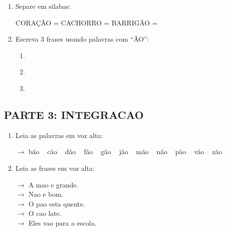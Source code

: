 \begin{exercicio}
\begin{enumerate}[resume]
  \item Separe em silabas:
  \begin{center}
  CORAÇÃO = \underline{\hspace{1cm}} \underline{\hspace{1cm}} \underline{\hspace{1cm}} \quad CACHORRO = \underline{\hspace{1cm}} \underline{\hspace{1cm}} \underline{\hspace{1cm}} \quad BARRIGÃO = \underline{\hspace{1cm}} \underline{\hspace{1cm}} \underline{\hspace{1cm}}
  \end{center}

  \item Escreva 3 frases usando palavras com ``ÃO'':
  \begin{enumerate}[label=\alph*)]
    \item \underline{\hspace{8cm}}
    \item \underline{\hspace{8cm}}
    \item \underline{\hspace{8cm}}
  \end{enumerate}
\end{enumerate}

\subsection*{PARTE 3: INTEGRACAO}

\begin{enumerate}[resume]
  \item Leia as palavras em voz alta:
  \begin{center}
  $\rightarrow$ bão  ~  cão  ~  dão  ~  fão  ~  gão  ~  jão  ~  mão  ~  não  ~  pão  ~  vão  ~  zão
  \end{center}

  \item Leia as frases em voz alta:
  \begin{center}
  $\rightarrow$ A mao e grande.\\
  $\rightarrow$ Nao e bom.\\
  $\rightarrow$ O pao esta quente.\\
  $\rightarrow$ O cao late.\\
  $\rightarrow$ Eles vao para a escola.
  \end{center}


\end{enumerate}
\end{exercicio}
